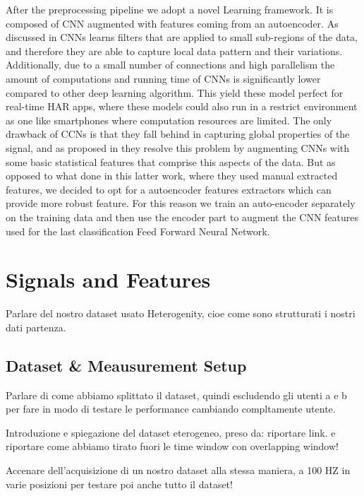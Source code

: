 After the preprocessing pipeline we adopt a novel Learning framework. It is composed of CNN augmented with features coming from an autoencoder. As discussed in \cite{ignatov2018real} CNNs learns filters that are applied to small sub-regions of the data, and therefore they are able to capture local data pattern and their variations. Additionally, due to a small number of connections and high parallelism the amount of computations and running time of CNNs is significantly lower compared to other deep learning algorithm. This yield these model perfect for real-time HAR apps, where these models could also run in a restrict environment as one like smartphones where computation resources are limited. The only drawback of CCNs is that they fall behind in capturing global properties of the signal, and as proposed in \cite{ignatov2018real} they resolve this problem by augmenting CNNs with some basic statistical features that comprise this aspects of the data. But as opposed to what done in this latter work, where they used manual extracted features, we decided to opt for a autoencoder features extractors which can provide more robust feature. For this reason we train an auto-encoder separately on the training data and then use the encoder part to augment the CNN features used for the last classification Feed Forward Neural Network.

\section{Signals and Features}
\label{sec:model}

Parlare del nostro dataset usato Heterogenity, cioe come sono strutturati i nostri dati partenza.



\subsection{Dataset \& Meausurement Setup}
\label{subsec:dataset-measurement-setup}
Parlare di come abbiamo splittato il dataset, quindi escludendo gli utenti a e b per fare in modo di testare le performance cambiando compltamente utente.

Introduzione e spiegazione del dataset eterogeneo, preso da: riportare link. e riportare come abbiamo tirato fuori le time window con overlapping window!

Accenare dell'acquisizione di un nostro dataset alla stessa maniera, a 100 HZ in varie posizioni per testare poi anche tutto il dataset!

